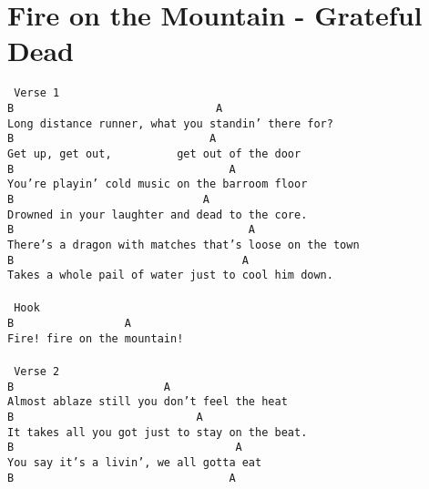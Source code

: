 \newpage
\section{Fire on the Mountain - Grateful Dead}
\label{Fire on the Mountain - Grateful Dead}
\texttt{\lbrack\ Verse\ 1\rbrack\\
B\ \ \ \ \ \ \ \ \ \ \ \ \ \ \ \ \ \ \ \ \ \ \ \ \ \ \ \ \ \ \ A\ \ \ \ \ \ \ \ \ \ \ \ \ \ \ \ \\
Long\ distance\ runner,\ what\ you\ standin'\ there\ for?\\
B\ \ \ \ \ \ \ \ \ \ \ \ \ \ \ \ \ \ \ \ \ \ \ \ \ \ \ \ \ \ A\\
Get\ up,\ get\ out,\ \ \ \ \ \ \ \ \ \ get\ out\ of\ the\ door\\
B\ \ \ \ \ \ \ \ \ \ \ \ \ \ \ \ \ \ \ \ \ \ \ \ \ \ \ \ \ \ \ \ \ A\\
You're\ playin'\ cold\ music\ on\ the\ barroom\ floor\\
B\ \ \ \ \ \ \ \ \ \ \ \ \ \ \ \ \ \ \ \ \ \ \ \ \ \ \ \ \ A\\
Drowned\ in\ your\ laughter\ and\ dead\ to\ the\ core.\\
B\ \ \ \ \ \ \ \ \ \ \ \ \ \ \ \ \ \ \ \ \ \ \ \ \ \ \ \ \ \ \ \ \ \ \ \ A\\
There's\ a\ dragon\ with\ matches\ that's\ loose\ on\ the\ town\\
B\ \ \ \ \ \ \ \ \ \ \ \ \ \ \ \ \ \ \ \ \ \ \ \ \ \ \ \ \ \ \ \ \ \ \ A\\
Takes\ a\ whole\ pail\ of\ water\ just\ to\ cool\ him\ down.\\
\\
\lbrack\ Hook\rbrack\\
B\ \ \ \ \ \ \ \ \ \ \ \ \ \ \ \ \ A\\
Fire!\ fire\ on\ the\ mountain!\\
\\
\lbrack\ Verse\ 2\rbrack\\
B\ \ \ \ \ \ \ \ \ \ \ \ \ \ \ \ \ \ \ \ \ \ \ A\\
Almost\ ablaze\ still\ you\ don't\ feel\ the\ heat\\
B\ \ \ \ \ \ \ \ \ \ \ \ \ \ \ \ \ \ \ \ \ \ \ \ \ \ \ \ A\\
It\ takes\ all\ you\ got\ just\ to\ stay\ on\ the\ beat.\\
B\ \ \ \ \ \ \ \ \ \ \ \ \ \ \ \ \ \ \ \ \ \ \ \ \ \ \ \ \ \ \ \ \ \ A\\
You\ say\ it's\ a\ livin',\ we\ all\ gotta\ eat\\
B\ \ \ \ \ \ \ \ \ \ \ \ \ \ \ \ \ \ \ \ \ \ \ \ \ \ \ \ \ \ \ \ \ A\\
}
